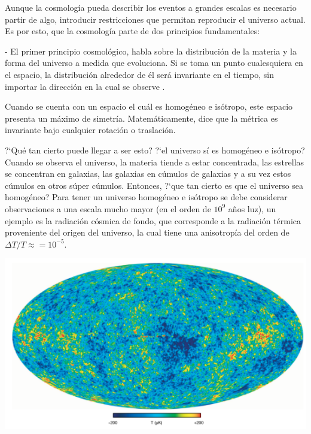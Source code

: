 Aunque la cosmología pueda describir los eventos a grandes escalas es necesario partir de algo, introducir restricciones que permitan reproducir el universo actual. Es por esto, que la cosmología parte de dos principios fundamentales:  

- El primer principio cosmológico, habla sobre la distribución de la materia y la forma del universo a medida que evoluciona. Si se toma un punto cualesquiera en el espacio, la distribución  alrededor de él será invariante en el tiempo, sin importar la dirección en la cual se observe \cite{janssen2013}. %


Cuando se cuenta con un espacio el cuál es homogéneo e isótropo, este espacio presenta un máximo de simetría.  Matemáticamente, dice que la métrica es invariante bajo cualquier rotación o traslación. 

?`Qué tan cierto puede llegar a ser esto? ?`el universo sí es homogéneo e isótropo? Cuando se observa el universo, la materia tiende a estar concentrada, las estrellas se concentran en galaxias, las galaxias en cúmulos de galaxias y a su vez estos cúmulos en otros súper cúmulos. Entonces, ?`que tan cierto es que el universo sea homogéneo? Para tener un universo homogéneo e isótropo se debe considerar observaciones a una escala mucho mayor (en el orden de $10^{9}$ años luz), un ejemplo es la radiación cósmica de fondo, que corresponde a la radiación térmica proveniente del origen del universo, la cual tiene una anisotropía del orden de $\Delta T /T \approx= 10^{-5}$\cite{bond1987}. 

\begin{center}
\includegraphics[scale=.5]{./figures/2_theoretical_framework/backgraundCosmicRadiation.png}
\label{fig:radiación_cosmica_de_fondo}
\end{center}

